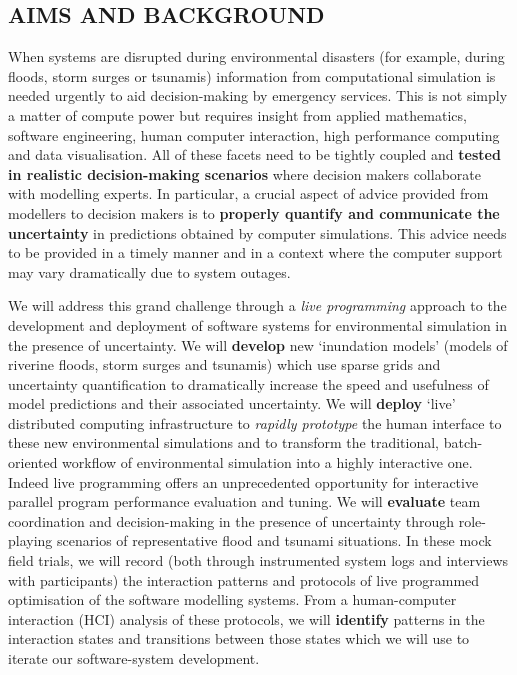 \subsection*{AIMS AND BACKGROUND}

When systems are disrupted during environmental disasters (for example,
during floods, storm surges or tsunamis) information from
computational simulation is needed urgently to aid decision-making by
emergency services. This is not simply a matter of compute power but
requires insight from applied mathematics, software
engineering, human computer interaction, high performance computing
and data visualisation. All of these facets need to be tightly coupled
and {\bf tested in realistic  decision-making
scenarios} where decision makers collaborate with modelling experts. In
particular, a crucial aspect of advice provided from modellers to
decision makers is to {\bf properly quantify and communicate the
{uncertainty}} in predictions obtained by computer simulations.
This advice needs to be provided in a timely manner and in a context
where the computer support may vary dramatically due to
system outages.

We will address this grand challenge through a \emph{live programming}
approach to the development and deployment of software systems for
environmental simulation in the presence of uncertainty. We will
\textbf{develop} new `inundation models' (models of riverine floods,
storm surges and tsunamis) which use sparse grids and uncertainty
quantification to dramatically increase the speed and usefulness of
model predictions and their associated uncertainty. We will
\textbf{deploy} `live' distributed computing infrastructure to
\emph{rapidly prototype} the human interface to these new
environmental simulations and to transform the traditional,
batch-oriented workflow of environmental simulation into a highly
interactive one. Indeed live programming offers an unprecedented opportunity
for interactive parallel program performance evaluation and tuning.
We will \textbf{evaluate} team coordination and
decision-making in the presence of uncertainty through role-playing
scenarios of representative flood and tsunami situations. In these mock
field trials, we will record (both through instrumented system logs
and interviews with participants) the interaction patterns and
protocols of live programmed optimisation of the software modelling
systems. From a human-computer interaction (HCI) analysis of these
protocols, we will \textbf{identify} patterns in the interaction
states and transitions between those states which we will use to
iterate our software-system development.

